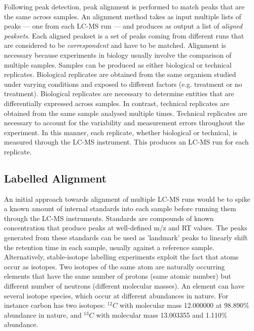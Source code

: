 Following peak detection, peak alignment is performed to match peaks that are the same across samples. An alignment method takes as input multiple lists of peaks --- one from each LC-MS run --- and produces as output a list of \emph{aligned peaksets}. Each aligned peakset is a set of peaks coming from different runs that are considered to be \emph{correspondent} and have to be matched. Alignment is necessary because experiments in biology usually involve the comparison of multiple samples. Samples can be produced as either biological or technical replicates. Biological replicates are obtained from the same organism studied under varying conditions and exposed to different factors (e.g. treatment or no treatment). Biological replicates are necessary to determine entities that are differentially expressed across samples. In contrast, technical replicates are obtained from the same sample analysed multiple times. Technical replicates are necessary to account for the variability and measurement errors throughout the experiment. In this manner, each replicate, whether biological or technical, is measured through the LC-MS instrument. This produces an LC-MS run for each replicate.

\subsection{Labelled Alignment}

An initial approach towards alignment of multiple LC-MS runs  would be to spike a known amount of internal standards into each sample before running them through the LC-MS instruments. Standards are compounds of known concentration that produce peaks at well-defined m/z and RT values. The peaks generated from these standards can be used as 'landmark' peaks to linearly shift the retention time in each sample, usually against a reference sample. Alternatively, stable-isotope labelling experiments exploit the fact that atoms occur as isotopes. Two isotopes of the same atom are naturally occurring elements that have the same number of protons (same atomic number) but different number of neutrons (different molecular masses). An element can have several isotope species, which occur at different abundances in nature. For instance carbon has two isotopes: $^{12}C$ with molecular mass 12.000000 at 98.890\% abundance in nature, and $^{13}C$ with molecular mass 13.003355 and 1.110\% abundance. 

